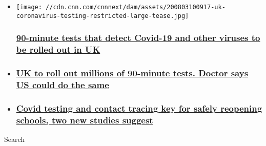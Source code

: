 \begin{itemize}
\item
  \href{/2020/08/03/health/90-minute-covid-19-testing-gbr-intl/index.html}{}

  \texttt{[image: //cdn.cnn.com/cnnnext/dam/assets/200803100917-uk-coronavirus-testing-restricted-large-tease.jpg]}

  \hypertarget{90-minute-tests-that-detect-covid-19-and-other-viruses-to-be-rolled-out-in-uk}{%
  \subsubsection{\texorpdfstring{\href{/2020/08/03/health/90-minute-covid-19-testing-gbr-intl/index.html}{90-minute
  tests that detect Covid-19 and other viruses to be rolled out in
  UK}}{90-minute tests that detect Covid-19 and other viruses to be rolled out in UK}}\label{90-minute-tests-that-detect-covid-19-and-other-viruses-to-be-rolled-out-in-uk}}
\item
  \hypertarget{uk-to-roll-out-millions-of-90-minute-tests-doctor-says-us-could-do-the-same}{%
  \subsubsection{\texorpdfstring{\href{/videos/health/2020/08/04/uk-90-minute-covid19-testing-ashish-jha-harvard-cpt-vpx.cnn}{UK
  to roll out millions of 90-minute tests. Doctor says US could do the
  same}}{UK to roll out millions of 90-minute tests. Doctor says US could do the same}}\label{uk-to-roll-out-millions-of-90-minute-tests-doctor-says-us-could-do-the-same}}
\item
  \hypertarget{covid-testing-and-contact-tracing-key-for-safely-reopening-schools-two-new-studies-suggest}{%
  \subsubsection{\texorpdfstring{\href{/2020/08/03/health/covid-testing-reopen-schools-study-wellness/index.html}{Covid
  testing and contact tracing key for safely reopening schools, two new
  studies
  suggest}}{Covid testing and contact tracing key for safely reopening schools, two new studies suggest}}\label{covid-testing-and-contact-tracing-key-for-safely-reopening-schools-two-new-studies-suggest}}
\end{itemize}

Search

